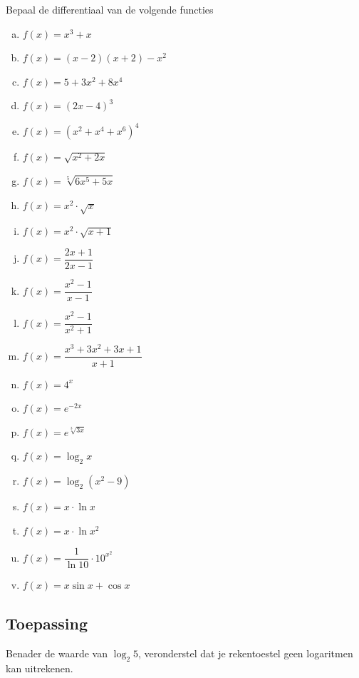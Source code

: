 \documentclass[a4paper,12pt, twoside]{article}
\begin{document}
\begin{oefening}
Bepaal de differentiaal van de volgende functies
\begin{multicols}{2}
\begin{enumerate}[(a)]
  \itemsep.5em
  \item $\displaystyle f(x)=x^3+x$
  \item $\displaystyle f(x)=(x-2)(x+2)-x^2$
  \item $\displaystyle f(x)=5+3x^2+8x^4$
  \item $\displaystyle f(x)=\left(2x-4\right)^3$
  \item $\displaystyle f(x)=\left(x^2+x^4+x^6\right)^4$
  \item $\displaystyle f(x)=\sqrt{x^2+2x}$
  \item $\displaystyle f(x)=\sqrt[5]{6x^5+5x}$
  \item $\displaystyle f(x)=x^2\cdot\sqrt{x}$
  \item $\displaystyle f(x)=x^2\cdot\sqrt{x+1}$
  \item $\displaystyle f(x)=\dfrac{2x+1}{2x-1}$
  \item $\displaystyle f(x)=\dfrac{x^2-1}{x-1}$
  \item $\displaystyle f(x)=\dfrac{x^2-1}{x^2+1}$
  \item $\displaystyle f(x)=\dfrac{x^3+3x^2+3x+1}{x+1}$
  \item $\displaystyle f(x)=4^{x}$
  \item $\displaystyle f(x)=e^{-2x}$
  \item $\displaystyle f(x)=e^{\sqrt[3]{3x}}$
  \item $\displaystyle f(x)=\log_2 x$
  \item $\displaystyle f(x)=\log_2 (x^2-9)$
  \item $\displaystyle f(x)=x\cdot \ln x$
  \item $\displaystyle f(x)=x\cdot \ln x^2$
  \item $\displaystyle f(x)=\dfrac{1}{\ln 10}\cdot 10^{x^2}$
  \item $\displaystyle f(x)=x\sin x + \cos x$
\end{enumerate}
\end{multicols}
\end{oefening}

\subsection{Toepassing}

Benader de waarde van $\log_2 5$, veronderstel dat je rekentoestel geen logaritmen kan uitrekenen.
\end{document}

